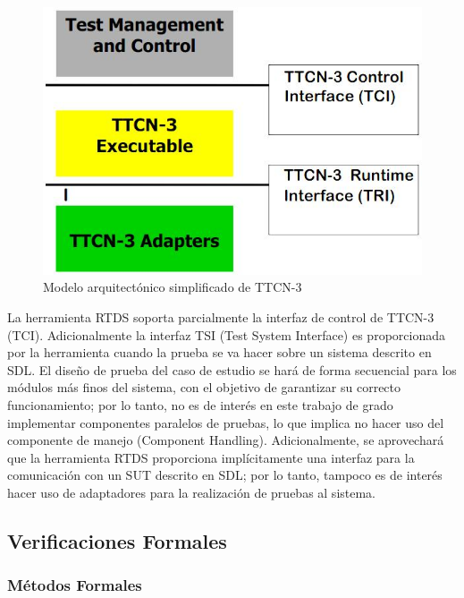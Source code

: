 \begin{figure}[!h]
  \centering
  \includegraphics[scale=0.5]{./images/ModeloTTCN3.jpg}
  \caption{Modelo arquitect\'onico simplificado de TTCN-3}
  \label{fig:modeloTTCN3}
\end{figure}

La herramienta RTDS soporta parcialmente la interfaz de control de TTCN-3 (TCI). 
Adicionalmente la interfaz TSI (Test System Interface) es proporcionada por la 
herramienta cuando la prueba se va hacer sobre un sistema descrito en SDL. El 
dise\~no de prueba del caso de estudio se har\'a de forma secuencial para los 
m\'odulos m\'as finos del sistema, con el objetivo de garantizar su correcto 
funcionamiento; por lo tanto, no es de inter\'es en este trabajo de grado 
implementar componentes paralelos de pruebas, lo que implica no hacer uso del 
componente de manejo (Component Handling). Adicionalmente, se aprovechar\'a que 
la herramienta RTDS proporciona impl\'icitamente una interfaz para la 
comunicaci\'on con un SUT descrito en SDL; por lo tanto, tampoco es de inter\'es 
hacer uso de adaptadores para la realizaci\'on de pruebas al sistema.


\subsection{Verificaciones Formales}

\subsubsection{M\'etodos Formales}

